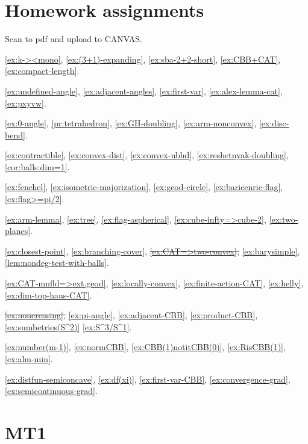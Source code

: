 \chapter*{Homework assignments}

Scan to pdf and upload to CANVAS.

\ref{ex:k-><mono},
\ref{ex:(3+1)-expanding},
\ref{ex:sba-2+2-short},
\ref{ex:CBB+CAT},
\ref{ex:compact-length}.

\ref{ex:undefined-angle},
\ref{ex:adjacent-angles},
\ref{ex:first-var},
\ref{ex:alex-lemma-cat},
\ref{ex:pxyvw}.

\ref{ex:0-angle},
\ref{pr:tetrahedron},
\ref{ex:GH-doubling},
\ref{ex:arm-nonconvex},
\ref{ex:disc-bend}.

\ref{ex:contractible},
\ref{ex:convex-dist},
\ref{ex:convex-nbhd},
\ref{ex:reshetnyak-doubling},
\ref{cor:balls:dim=1}.

\ref{ex:fenchel},
\ref{ex:isometric-majorization},
\ref{ex:geod-circle},
\ref{ex:baricenric-flag},
\ref{ex:flag>=pi/2}.

\ref{ex:arm-lemma},
\ref{ex:tree},
\ref{ex:flag-aspherical},
\ref{ex:cube-infty=>cube-2},
\ref{ex:two-planes}.

\ref{ex:closest-point},
\ref{ex:branching-cover},
\sout{\ref{ex:CAT=>two-convex},}
\ref{ex:barysimple},
\ref{lem:nondeg-test-with-balls}.

\ref{ex:CAT-mnfld=>ext.geod},
\ref{ex:locally-convex},
\ref{ex:finite-action-CAT},
\ref{ex:helly},
\ref{ex:dim-top-haus-CAT}.

\sout{\ref{ex:noncreasing},}
\ref{ex:pi-angle},
\ref{ex:adjacent-CBB},
\ref{ex:product-CBB},
\ref{ex:sumbetries(S^2)}
\ref{ex:S^3/S^1}.

\ref{ex:number(m-1)},
\ref{ex:normCBB},
\ref{ex:CBB(1)notitCBB(0)},
\ref{ex:RisCBB(1)},
\ref{ex:alm-min}.

\ref{ex:distfun-semiconcave},
\ref{ex:df(xi)},
\ref{ex:first-var-CBB},
\ref{ex:convergence-grad},
\ref{ex:semicontinuous-grad}.
\newpage

\chapter*{MT1}

